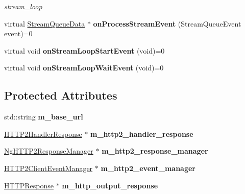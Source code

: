 \begin{DoxyCompactItemize}
\begin{DoxyCompactList}\small\item\em stream\+\_\+loop \end{DoxyCompactList}\item 
\mbox{\label{classNetwork_1_1HTTP2_1_1HTTP2Client_a8b134b7cf7b96b2b1c7f6f65636b630e}} 
virtual \hyperlink{structNetwork_1_1HTTP2_1_1StreamQueueData}{Stream\+Queue\+Data} $\ast$ {\bfseries on\+Process\+Stream\+Event} (Stream\+Queue\+Event event)=0
\item 
\mbox{\label{classNetwork_1_1HTTP2_1_1HTTP2Client_aeecc6cec389077e163cee57bb1e626b0}} 
virtual void {\bfseries on\+Stream\+Loop\+Start\+Event} (void)=0
\item 
\mbox{\label{classNetwork_1_1HTTP2_1_1HTTP2Client_a286cbb2cb6406ddd6514aeee757f2aae}} 
virtual void {\bfseries on\+Stream\+Loop\+Wait\+Event} (void)=0
\end{DoxyCompactItemize}
\subsection*{Protected Attributes}
\begin{DoxyCompactItemize}
\item 
\mbox{\label{classNetwork_1_1HTTP2_1_1HTTP2Client_a0038606058e6f5dd9f77adfced2a7ffe}} 
std\+::string {\bfseries m\+\_\+base\+\_\+url}
\item 
\mbox{\label{classNetwork_1_1HTTP2_1_1HTTP2Client_afad154fd7ed41e5c7f0f8829952ff44f}} 
\hyperlink{structNetwork_1_1HTTP2_1_1HTTP2HandlerResponse}{H\+T\+T\+P2\+Handler\+Response} $\ast$ {\bfseries m\+\_\+http2\+\_\+handler\+\_\+response}
\item 
\mbox{\label{classNetwork_1_1HTTP2_1_1HTTP2Client_a83fe546902bc6be3fd2006c9517cb218}} 
\hyperlink{classNetwork_1_1HTTP2_1_1NgHTTP2ResponseManager}{Ng\+H\+T\+T\+P2\+Response\+Manager} $\ast$ {\bfseries m\+\_\+http2\+\_\+response\+\_\+manager}
\item 
\mbox{\label{classNetwork_1_1HTTP2_1_1HTTP2Client_a54262bf3e08d6ad8a6eca39fe8d6b02f}} 
\hyperlink{classNetwork_1_1HTTP2_1_1HTTP2ClientEventManager}{H\+T\+T\+P2\+Client\+Event\+Manager} $\ast$ {\bfseries m\+\_\+http2\+\_\+event\+\_\+manager}
\item 
\mbox{\label{classNetwork_1_1HTTP2_1_1HTTP2Client_a82bad5a94c9004a1e586a53bd99c8b3b}} 
\hyperlink{classNetwork_1_1HTTP_1_1HTTPResponse}{H\+T\+T\+P\+Response} $\ast$ {\bfseries m\+\_\+http\+\_\+output\+\_\+response}
\end{DoxyCompactItemize}
